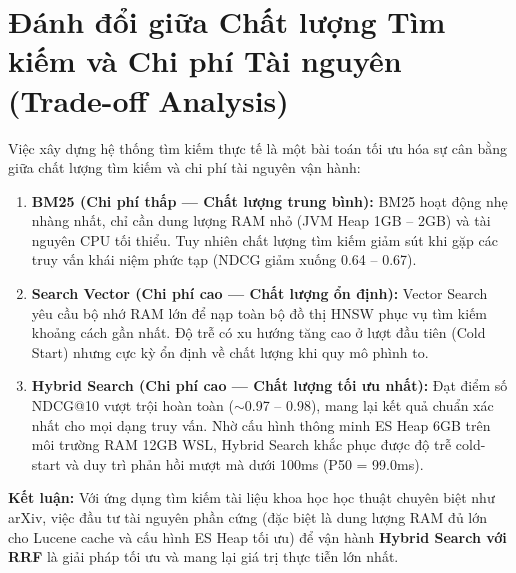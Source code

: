 \section{Đánh đổi giữa Chất lượng Tìm kiếm và Chi phí Tài nguyên (Trade-off Analysis)}
Việc xây dựng hệ thống tìm kiếm thực tế là một bài toán tối ưu hóa sự cân bằng giữa chất lượng tìm kiếm và chi phí tài nguyên vận hành:
\begin{enumerate}
    \item \textbf{BM25 (Chi phí thấp --- Chất lượng trung bình):} BM25 hoạt động nhẹ nhàng nhất, chỉ cần dung lượng RAM nhỏ (JVM Heap 1GB -- 2GB) và tài nguyên CPU tối thiểu. Tuy nhiên chất lượng tìm kiếm giảm sút khi gặp các truy vấn khái niệm phức tạp (NDCG giảm xuống 0.64 -- 0.67).
    \item \textbf{Search Vector (Chi phí cao --- Chất lượng ổn định):} Vector Search yêu cầu bộ nhớ RAM lớn để nạp toàn bộ đồ thị HNSW phục vụ tìm kiếm khoảng cách gần nhất. Độ trễ có xu hướng tăng cao ở lượt đầu tiên (Cold Start) nhưng cực kỳ ổn định về chất lượng khi quy mô phình to.
    \item \textbf{Hybrid Search (Chi phí cao --- Chất lượng tối ưu nhất):} Đạt điểm số NDCG@10 vượt trội hoàn toàn ($\sim$0.97 -- 0.98), mang lại kết quả chuẩn xác nhất cho mọi dạng truy vấn. Nhờ cấu hình thông minh ES Heap 6GB trên môi trường RAM 12GB WSL, Hybrid Search khắc phục được độ trễ cold-start và duy trì phản hồi mượt mà dưới 100ms (P50 = 99.0ms).
\end{enumerate}
\textbf{Kết luận:} Với ứng dụng tìm kiếm tài liệu khoa học học thuật chuyên biệt như arXiv, việc đầu tư tài nguyên phần cứng (đặc biệt là dung lượng RAM đủ lớn cho Lucene cache và cấu hình ES Heap tối ưu) để vận hành \textbf{Hybrid Search với RRF} là giải pháp tối ưu và mang lại giá trị thực tiễn lớn nhất.
